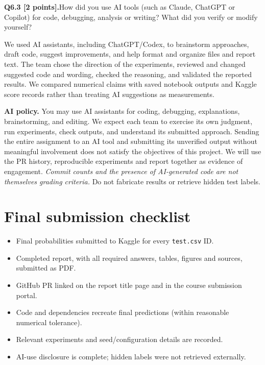 \documentclass[11pt,letterpaper]{article}
\newcommand{\question}[2]{\needspace{4\baselineskip}\par\addvspace{0.45em}\noindent\textbf{#1}\quad #2\par\nobreak\vspace{0.1em}}
\begin{document}
\question{Q6.3 [2 points].}{How did you use AI tools (such as Claude, ChatGPT or Copilot) for code, debugging, analysis or writing? What did you verify or modify yourself?}
We used AI assistants, including ChatGPT/Codex, to brainstorm approaches, draft code, suggest improvements, and help format and organize files and report text. The team chose the direction of the experiments, reviewed and changed suggested code and wording, checked the reasoning, and validated the reported results. We compared numerical claims with saved notebook outputs and Kaggle score records rather than treating AI suggestions as measurements.

\vspace{-0.3em}
\textbf{AI policy.} You may use AI assistants for coding, debugging, explanations, brainstorming, and editing. We expect each team to exercise its own judgment, run experiments, check outputs, and understand its submitted approach. Sending the entire assignment to an AI tool and submitting its unverified output without meaningful involvement does not satisfy the objectives of this project. We will use the PR history, reproducible experiments and report together as evidence of engagement. \emph{Commit counts and the presence of AI-generated code are not themselves grading criteria.} Do not fabricate results or retrieve hidden test labels.

\vspace{-0.4em}
\section*{Final submission checklist}
\vspace{-0.2em}
\begin{itemize}[label=$\boxtimes$,topsep=0pt,itemsep=0pt,parsep=0pt]
\item Final probabilities submitted to Kaggle for every \texttt{test.csv} ID.
\item Completed report, with all required answers, tables, figures and sources, submitted as PDF.
\item GitHub PR linked on the report title page and in the course submission portal.
\item Code and dependencies recreate final predictions (within reasonable numerical tolerance).
\item Relevant experiments and seed/configuration details are recorded.
\item AI-use disclosure is complete; hidden labels were not retrieved externally.
\end{itemize}
\end{document}
